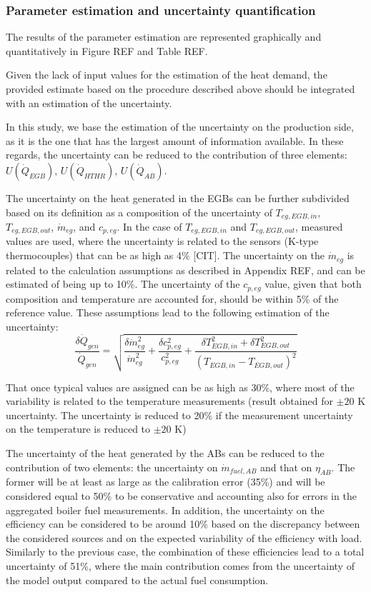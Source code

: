 \documentclass[preprint,12pt]{elsarticle}
\begin{document}
\subsubsection{Parameter estimation and uncertainty quantification}

The results of the parameter estimation are represented graphically and quantitatively in Figure REF and Table REF. 



Given the lack of input values for the estimation of the heat demand, the provided estimate based on the procedure described above should be integrated with an estimation of the uncertainty. 

In this study, we base the estimation of the uncertainty on the production side, as it is the one that has the largest amount of information available. In these regards, the uncertainty can be reduced to the contribution of three elements: $U(\dot{Q}_{EGB})$, $U(\dot{Q}_{HTHR})$, $U(\dot{Q}_{AB})$.

The uncertainty on the heat generated in the EGBs can be further subdivided based on its definition as a composition of the uncertainty of $T_{eg,EGB,in}$, $T_{eg,EGB,out}$, $\dot{m}_{eg}$, and $c_{p,eg}$. In the case of $T_{eg,EGB,in}$ and $T_{eg,EGB,out}$, measured values are used, where the uncertainty is related to the sensors (K-type thermocouples) that can be as high as 4\% [CIT]. The uncertainty on the $\dot{m}_{eg}$ is related to the calculation assumptions as described in Appendix REF, and can be estimated of being up to 10\%. The uncertainty of the $c_{p,eg}$ value, given that both composition and temperature are accounted for, should be within 5\% of the reference value. These assumptions lead to the following estimation of the uncertainty:
\begin{equation}
\frac{\delta \dot{Q}_{gen}}{\dot{Q}_{gen}} = \sqrt{\frac{\delta \dot{m}_{eg}^2}{\dot{m}_{eg}^2} + \frac{\delta c_{p,eg}^2}{c_{p,eg}^2} + \frac{\delta T_{EGB,in}^2 + \delta T_{EGB,out}^2}{(T_{EGB,in} - T_{EGB,out})^2}}
\end{equation}

That once typical values are assigned can be as high as 30\%, where most of the variability is related to the temperature measurements (result obtained for $\pm 20$ K uncertainty. The uncertainty is reduced to 20\% if the measurement uncertainty on the temperature is reduced to  $\pm 20$ K) 

The uncertainty of the heat generated by the ABs can be reduced to the contribution of two elements: the uncertainty on $\dot{m}_{fuel,AB}$ and that on $\eta_{AB}$. The former will be at least as large as the calibration error (35\%) and will be considered equal to 50\% to be conservative and accounting also for errors in the aggregated boiler fuel measurements. In addition, the uncertainty on the efficiency can be considered to be around 10\% based on the discrepancy between the considered sources and on the expected variability of the efficiency with load. Similarly to the previous case, the combination of these efficiencies lead to a total uncertainty of 51\%, where the main contribution comes from the uncertainty of the model output compared to the actual fuel consumption.
\end{document}
